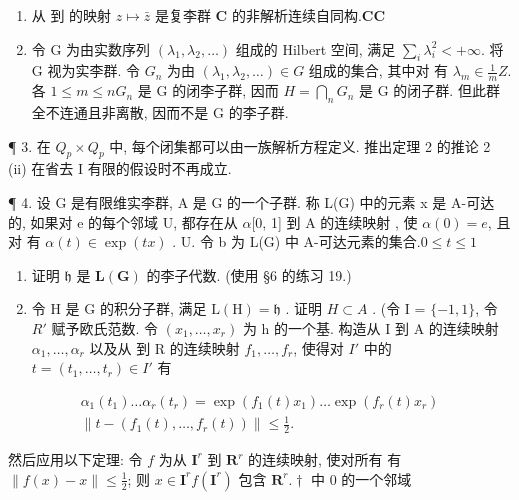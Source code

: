 
\begin{enumerate}
\def\labelenumi{\arabic{enumi}.}
\item
  从  到  的映射 \(z \mapsto \bar{z}\) 是复李群 \(\mathbf{C}\) 的非解析连续自同构.\(\mathbf{C}\)\(\mathbf{C}\)
\item
  令 G 为由实数序列 \((\lambda_{1}, \lambda_{2}, \ldots)\) 组成的 Hilbert 空间, 满足 \(\sum_{i} \lambda_{i}^{2} < +\infty\). 将 G 视为实李群. 令 \(G_{n}\) 为由 \((\lambda_{1}, \lambda_{2}, \ldots) \in G\) 组成的集合, 其中对  有 \(\lambda_{m} \in \frac{1}{m} Z\). 各 \(1 \leqslant m \leqslant n\)\(G_{n}\) 是 G 的闭李子群, 因而 \(H = \bigcap_{n} G_{n}\) 是 G 的闭子群. 但此群全不连通且非离散, 因而不是 G 的李子群.
\end{enumerate}

¶ 3. 在 \(Q_{p} \times Q_{p}\) 中, 每个闭集都可以由一族解析方程定义. 推出定理 2 的推论 2 (ii) 在省去 I 有限的假设时不再成立.

¶ 4. 设 G 是有限维实李群, A 是 G 的一个子群. 称 L(G) 中的元素 x 是 A-可达的, 如果对 e 的每个邻域 U, 都存在从 \(\alpha\){[}0, 1{]} 到 A 的连续映射 , 使 \(\alpha(0) = e\), 且对  有 \(\alpha(t) \in \exp(tx)\) . U. 令 b 为 L(G) 中 A-可达元素的集合.\(0 \leqslant t \leqslant 1\)

\begin{enumerate}
\def\labelenumi{(\alph{enumi})}
\item
  证明 \(\mathfrak{h}\) 是 \(\mathbf{L}(\mathbf{G})\) 的李子代数. (使用 §6 的练习 19.)
\item
  令 H 是 G 的积分子群, 满足 \(\mathrm{L}(\mathrm{H}) = \mathfrak{h}\) . 证明 \(H \subset A\) . (令 I = \(\{-1, 1\}\), 令 \(R'\) 赋予欧氏范数. 令 \((x_{1}, \ldots, x_{r})\) 为 h 的一个基. 构造从 I 到 A 的连续映射 \(\alpha_{1}, \ldots, \alpha_{r}\) 以及从  到 R 的连续映射 \(f_{1}, \ldots, f_{r}\), 使得对 \(I'\) 中的 \(t = (t_{1}, \ldots, t_{r}) \in I'\) 有
\end{enumerate}

\[
\begin{array}{c} \alpha_ {1} (t _ {1}) \ldots \alpha_ {r} (t _ {r}) = \exp (f _ {1} (t) x _ {1}) \ldots \exp (f _ {r} (t) x _ {r}) \\ \| t - (f _ {1} (t), \ldots , f _ {r} (t)) \| \leqslant \frac {1}{2}. \end{array}
\]

然后应用以下定理: 令 \(f\) 为从 \(\mathbf{I}^r\) 到 \(\mathbf{R}^r\) 的连续映射, 使对所有  有 \(\| f(x) - x \| \leqslant \frac{1}{2}\); 则 \(x \in \mathbf{I}^r\)\(f(\mathbf{I}^r)\) 包含 \(\mathbf{R}^r. \dagger\) 中 0 的一个邻域

